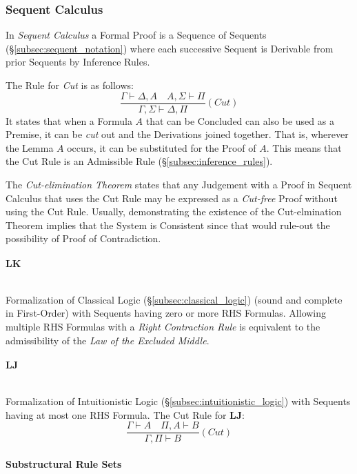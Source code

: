 \documentclass{article}
\begin{document}
\subsubsection{Sequent Calculus}

In \emph{Sequent Calculus} a Formal Proof is a Sequence of Sequents
(\S\ref{subsec:sequent_notation}) where each successive Sequent is
Derivable from prior Sequents by Inference Rules.

The Rule for \emph{Cut} is as follows:
\[
    \frac{
        \Gamma \vdash \Delta, A \quad A, \Sigma \vdash \Pi
    }{
        \Gamma, \Sigma \vdash \Delta, \Pi
    }(Cut)
\]
It states that when a Formula $A$ that can be Concluded can also be
used as a Premise, it can be \emph{cut} out and the Derivations joined
together. That is, wherever the Lemma $A$ occurs, it can be
substituted for the Proof of $A$. This means that the Cut Rule is an
Admissible Rule (\S\ref{subsec:inference_rules}).

The \emph{Cut-elimination Theorem} states that any Judgement with a
Proof in Sequent Calculus that uses the Cut Rule may be expressed as a
\emph{Cut-free} Proof without using the Cut Rule. Usually,
demonstrating the existence of the Cut-elmination Theorem implies that
the System is Consistent since that would rule-out the possibility of
Proof of Contradiction.

\paragraph{$\mathbf{LK}$} \hfill \\

Formalization of Classical Logic (\S\ref{subsec:classical_logic})
(sound and complete in First-Order) with Sequents having zero or more
RHS Formulas. Allowing multiple RHS Formulas with a \emph{Right
  Contraction Rule} is equivalent to the admissibility of the
\emph{Law of the Excluded Middle}.

\paragraph{$\mathbf{LJ}$} \hfill \\

Formalization of Intuitionistic Logic
(\S\ref{subsec:intuitionistic_logic}) with Sequents having at most one
RHS Formula. The Cut Rule for $\mathbf{LJ}$:
\[
    \frac{
        \Gamma \vdash A \quad \Pi, A \vdash B
    }{
        \Gamma, \Pi \vdash B
    }(Cut)
\]

\paragraph{Substructural Rule Sets} \hfill \\
\end{document}
